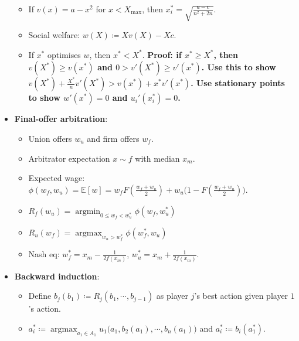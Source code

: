 \documentclass[8pt]{article}
\DeclareMathOperator*{\argmax}{argmax}
\DeclareMathOperator*{\argmin}{argmin}
\begin{document}
\begin{multicols*}{3}
\begin{itemize}
\begin{itemize}
                \item If $v\left(x\right) = a - x^2$ for $x < X_{\max}$, then $x_i^* = \sqrt{\frac{a - c}{n^2 + 2n}}$.
                \item Social welfare: $w\left(X\right) \coloneqq Xv\left(X\right) - Xc$.
                \item If $x^*$ optimises $w$, then $x^* < X^*$. \textbf{Proof: if $x^* \geq X^*$, then $v\left(X^*\right) \geq v\left(x^*\right)$ and $0 > v'\left(X^*\right) \geq v'\left(x^*\right)$. Use this to show $v\left(X^*\right) + \frac{X^*}{n}v'\left(X^*\right) > v\left(x^*\right) + x^*v'\left(x^*\right)$. Use stationary points to show $w'\left(x^*\right) = 0$ and $u_i'\left(x_i^*\right) = 0$.}
            \end{itemize}
            \item \textbf{Final-offer arbitration}:
            \begin{itemize}
                \setlength\itemsep{0pt}
                \item Union offers $w_u$ and firm offers $w_f$.
                \item Arbitrator expectation $x \sim f$ with median $x_m$.
                \item Expected wage: $\phi\left(w_f, w_u\right) = \mathbb{E}\left[w\right] = w_fF\left(\frac{w_f + w_u}{2}\right) + w_u\biggl(1 - F\left(\frac{w_f + w_u}{2}\right)\biggr)$.
                \item $R_f\left(w_u\right) = \argmin_{0 \leq w_f < w_u^*}\phi\left(w_f, w_u^*\right)$
                \item $R_u\left(w_f\right) = \argmax_{w_u > w_f^*}\phi\left(w_f^*, w_u\right)$
                \item Nash eq: $w_f^* = x_m - \frac{1}{2f\left(x_m\right)}$, $w_u^* = x_m + \frac{1}{2f\left(x_m\right)}$.
            \end{itemize}
            \item \textbf{Backward induction}: 
            \begin{itemize}
                \setlength\itemsep{0pt}
                \item Define $b_j\left(b_1\right) \coloneqq R_j\left(b_1, \cdots, b_{j - 1}\right)$ as player $j$'s best action given player $1$'s action.
                \item $a_i^* \coloneqq \argmax_{a_1 \in A_1}u_1\bigl(a_1, b_2\left(a_1\right), \cdots, b_n\left(a_1\right)\bigr)$ and $a_i^* \coloneqq b_i\left(a_1^*\right)$.
            \end{itemize}

\end{itemize}
\end{multicols*}
\end{document}
